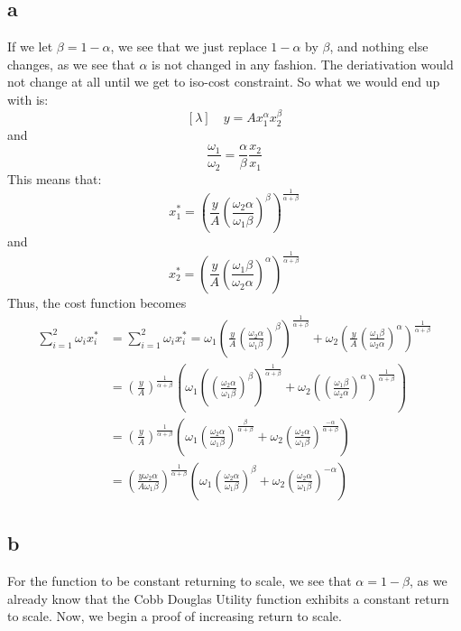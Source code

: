 \documentclass[11pt]{article}
\begin{document}
\subsection*{a}
If we let $\beta = 1-\alpha$, we see that we just replace $1 -\alpha$ by $\beta$, and nothing else changes, as we see that $\alpha$ is not changed in any fashion. The deriativation would not change at all until we get to iso-cost constraint. So what we would end up with is:
\[
[\lambda] \quad y = Ax_1^\alpha x_2^\beta
\]
and 
\[
\frac{\omega_1}{\omega_2} = \frac{\alpha}{\beta} \frac{x_2}{x_1}
\]
This means that:
\[
x_1^* = \left( \frac{y}{A} \left( \frac{\omega_2 \alpha}{\omega_1 \beta} \right)^\beta \right)^{\frac{1}{\alpha + \beta}}
\]
and 
\[
x_2^* = \left( \frac{y}{A} \left( \frac{\omega_1 \beta}{\omega_2 \alpha} \right)^\alpha \right)^{\frac{1}{\alpha + \beta}}
\]
Thus, the cost function becomes 
\begin{align*}
    \sum_{i =1}^2 \omega_i x_i^* &= 
    \sum_{i = 1}^2 \omega_i x_i^* = \omega_1 \left( \frac{y}{A} \left( \frac{\omega_2 \alpha}{\omega_1 \beta} \right)^\beta \right)^{\frac{1}{\alpha + \beta}} + \omega_2 \left( \frac{y}{A} \left( \frac{\omega_1 \beta}{\omega_2 \alpha} \right)^\alpha \right)^{\frac{1}{\alpha + \beta}}\\
    &= \left( \frac{y}{A} \right)^{\frac{1}{\alpha + \beta}} \left( \omega_1 \left(\left( \frac{\omega_2 \alpha}{\omega_1 \beta} \right)^\beta \right)^\frac{1}{\alpha + \beta} + \omega_2 \left( \left( \frac{\omega_1 \beta}{\omega_2 \alpha} \right)^\alpha\right)^\frac{1}{\alpha + \beta}\right)\\
    &= \left( \frac{y}{A} \right)^\frac{1}{\alpha + \beta} \left( \omega_1 \left( \frac{\omega_2 \alpha}{\omega_1 \beta} \right)^\frac{\beta}{\alpha + \beta} + \omega_2 \left( \frac{\omega_2 \alpha}{\omega_1 \beta} \right)^\frac{-\alpha}{\alpha + \beta} \right)\\
    &= \left( \frac{y \omega_2 \alpha}{A \omega_1 \beta} \right)^\frac{1}{\alpha + \beta} \left( \omega_1 \left( \frac{\omega_2 \alpha}{\omega_1 \beta} \right)^\beta + \omega_2 \left( \frac{\omega_2 \alpha}{\omega_1 \beta} \right)^{-\alpha} \right)
\end{align*}
\subsection*{b}
For the function to be constant returning to scale, we see that $\alpha = 1 - \beta$, as we already know that the Cobb Douglas Utility function exhibits a constant return to scale. Now, we begin a proof of increasing return to scale. 
\end{document}
